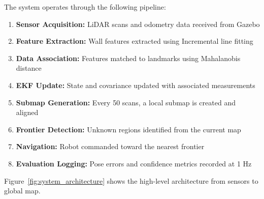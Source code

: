 \documentclass[11pt]{article}
\begin{document}
The system operates through the following pipeline:

\begin{enumerate}
	\item \textbf{Sensor Acquisition:} LiDAR scans and odometry data received from Gazebo
	\item \textbf{Feature Extraction:} Wall features extracted using Incremental line fitting
	\item \textbf{Data Association:} Features matched to landmarks using Mahalanobis distance
	\item \textbf{EKF Update:} State and covariance updated with associated measurements
	\item \textbf{Submap Generation:} Every 50 scans, a local submap is created and aligned
	\item \textbf{Frontier Detection:} Unknown regions identified from the current map
	\item \textbf{Navigation:} Robot commanded toward the nearest frontier
	\item \textbf{Evaluation Logging:} Pose errors and confidence metrics recorded at 1 Hz
\end{enumerate}

Figure~\ref{fig:system_architecture} shows the high-level architecture from sensors to global map.
\end{document}
